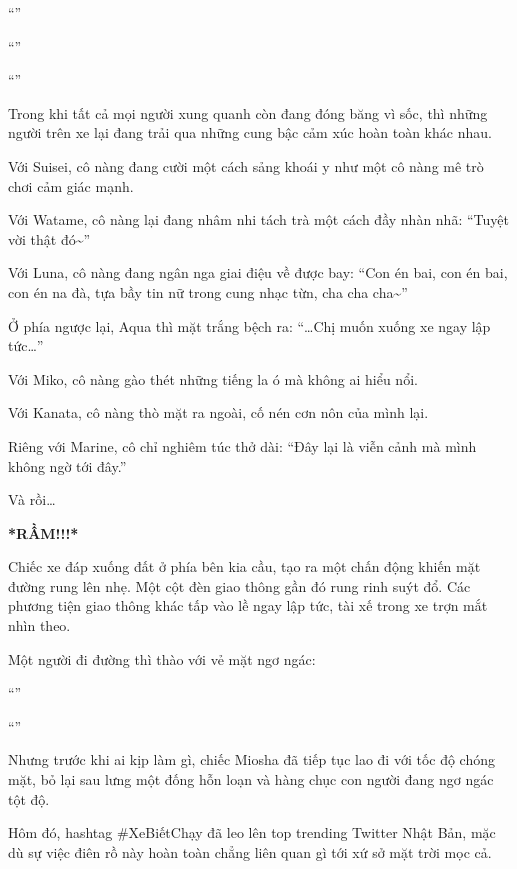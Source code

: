 \documentclass[../main.tex]{subfiles}
\begin{document}
``''

``''

``''

Trong khi tất cả mọi người xung quanh còn đang đóng băng vì sốc, thì những người trên xe lại đang trải qua những cung bậc cảm xúc hoàn toàn khác nhau.

Với Suisei, cô nàng đang cười một cách sảng khoái y như một cô nàng mê trò chơi cảm giác mạnh.

Với Watame, cô nàng lại đang nhâm nhi tách trà một cách đầy nhàn nhã: ``Tuyệt vời thật đó\~{}''

Với Luna, cô nàng đang ngân nga giai điệu về được bay: ``Con én bai, con én bai, con én na đà, tựa bầy tin nữ trong cung nhạc từn, cha cha cha\~{}''

Ở phía ngược lại, Aqua thì mặt trắng bệch ra: ``\dots Chị muốn xuống xe ngay lập tức\dots''

Với Miko, cô nàng gào thét những tiếng la ó mà không ai hiểu nổi.

Với Kanata, cô nàng thò mặt ra ngoài, cố nén cơn nôn của mình lại.

Riêng với Marine, cô chỉ nghiêm túc thở dài: ``Đây lại là viễn cảnh mà mình không ngờ tới đây.''

Và rồi\dots

\textbf{*RẦM!!!*}

Chiếc xe đáp xuống đất ở phía bên kia cầu, tạo ra một chấn động khiến mặt đường rung lên nhẹ. Một cột đèn giao thông gần đó rung rinh suýt đổ. Các phương tiện giao thông khác tấp vào lề ngay lập tức, tài xế trong xe trợn mắt nhìn theo.

Một người đi đường thì thào với vẻ mặt ngơ ngác:

``''

``''

Nhưng trước khi ai kịp làm gì, chiếc Miosha đã tiếp tục lao đi với tốc độ chóng mặt, bỏ lại sau lưng một đống hỗn loạn và hàng chục con người đang ngơ ngác tột độ.

Hôm đó, hashtag \#XeBiếtChạy đã leo lên top trending Twitter Nhật Bản, mặc dù sự việc điên rồ này hoàn toàn chẳng liên quan gì tới xứ sở mặt trời mọc cả.

\subsubsection*{\label{P1.1b}}
\end{document}

